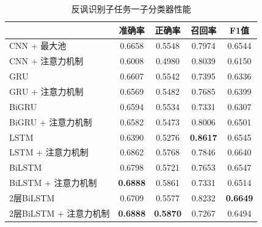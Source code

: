 \begin{table}[htb]
  \centering
  \begin{minipage}[t]{0.8\linewidth}
  \caption{反讽识别子任务一子分类器性能}
  \label{tab:exp_irony_det_A_single_result}
    \begin{tabularx}{\linewidth}{X|cccc}
    \toprule[1.5pt]
    & 准确率 & 正确率 & 召回率 & F1值 \\
    \hline
    CNN + 最大池 & 0.6658 & 0.5548 & 0.7974 & 0.6544 \\ %
    CNN + 注意力机制 & 0.6008 & 0.4980 & 0.8039 & 0.6150 \\  %
    \hline
    GRU & 0.6607 & 0.5542 & 0.7395 & 0.6336 \\ %
    GRU + 注意力机制 & 0.6569 & 0.5482 & 0.7685 & 0.6399 \\ %
    \hline
    BiGRU & 0.6594 & 0.5534 & 0.7331 & 0.6307 \\ %
    BiGRU + 注意力机制 & 0.6582 & 0.5473 & 0.8006 & 0.6501 \\ %
    \hline
    LSTM & 0.6390 & 0.5276 & \bf 0.8617 & 0.6545 \\ %
    LSTM + 注意力机制 & 0.6862 & 0.5768 & 0.7846 & 0.6640 \\ %
    \hline
    BiLSTM & 0.6798 & 0.5721 & 0.7653 & 0.6547 \\ %
    BiLSTM + 注意力机制 & \bf 0.6888 & 0.5861 & 0.7331 & 0.6514 \\ %
    2层BiLSTM & 0.6709 & 0.5577 & 0.8232 & \bf 0.6649 \\ %
    2层BiLSTM + 注意力机制 & \bf 0.6888 & \bf 0.5870 & 0.7267 & 0.6494 \\ %
    \bottomrule[1.5pt]
    \end{tabularx}
  \end{minipage}
\end{table}

